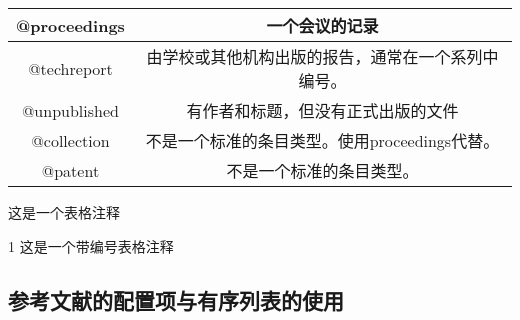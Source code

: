 \documentclass{bjfu}
\begin{document}
\begin{table}[h]
{\begin{threeparttable}
\begin{tabular}{c|c}
                \hline
                @proceedings &一个会议的记录 \\
                \hline
                @techreport &由学校或其他机构出版的报告，通常在一个系列中编号。 \\
                \hline
                @unpublished& 有作者和标题，但没有正式出版的文件 \\
                \hline
                @collection& 不是一个标准的条目类型。使用proceedings代替。 \\
                \hline
                @patent& 不是一个标准的条目类型。 \\
                \hline
            \end{tabular}
            \begin{tablenotes}
                \tiny
                \item  这是一个表格注释
                \item[1]  这是一个带编号表格注释%
            \end{tablenotes} 
        \end{threeparttable}
    }
    \label{Table:reference} %
\end{table}

\subsection{参考文献的配置项与有序列表的使用}
\end{document}
